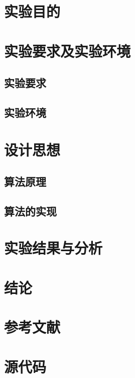 \documentclass{BIGDATA}
\begin{document}
\maketitle

\tableofcontents
\newpage

\section{实验目的}

\section{实验要求及实验环境}

\subsection{实验要求}

\subsection{实验环境}


\section{设计思想}

\subsection{算法原理}

\subsection{算法的实现}

\section{实验结果与分析}


\section{结论}


\section{参考文献}

\appendix

\section{源代码}
\end{document}
